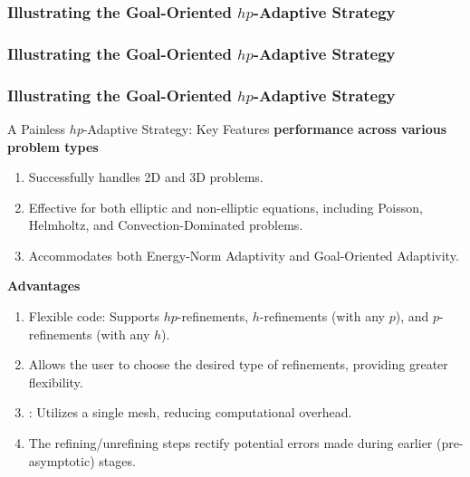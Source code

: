 \documentclass[10pt,aspectratio=169]{beamer}
\begin{document}
\begin{frame}[c]
	\frametitle{Illustrating the Goal-Oriented $hp$-Adaptive Strategy}
	\begin{figure}[t!]
	\end{figure}
\end{frame}
\begin{frame}[c]
	\frametitle{Illustrating the Goal-Oriented $hp$-Adaptive Strategy}
\end{frame}
\begin{frame}
	\frametitle{Illustrating the Goal-Oriented $hp$-Adaptive Strategy}
\end{frame}
\begin{frame}{A Painless $hp$-Adaptive Strategy: Key Features}
\textbf{ performance across various problem types}
\setlength{\itemsep}{1mm}
\begin{enumerate}
\item Successfully handles 2D and 3D problems.
\item Effective for both elliptic and non-elliptic equations, including Poisson, Helmholtz, and Convection-Dominated problems.
\item Accommodates both Energy-Norm Adaptivity and Goal-Oriented Adaptivity.
\end{enumerate}

\vspace{5mm}

\textbf{Advantages}
\begin{enumerate}
\item \alert{Flexible} code: Supports $hp$-refinements, $h$-refinements (with any $p$), and $p$-refinements (with any $h$).
\item Allows the user to choose the desired type of refinements, providing greater flexibility.
\item {}: Utilizes a single mesh, reducing computational overhead.
\item The refining/unrefining steps \alert{rectify} potential \alert{errors} made during earlier (pre-asymptotic) stages.
\end{enumerate}
\end{frame}
\end{document}
